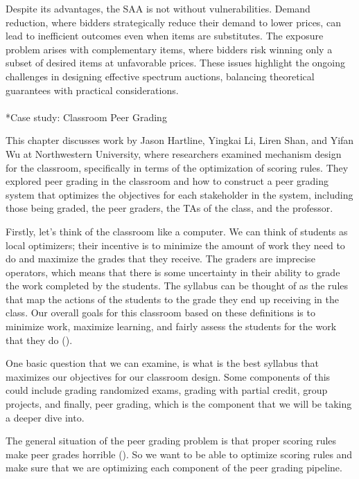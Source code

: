 \documentclass[
  letterpaper,
  numbers=noenddot,
  DIV=11]{scrreprt}
\makeatletter
\let\oldparagraph\paragraph
\renewcommand{\paragraph}{
    \@ifstar
      \xxxParagraphStar
      \xxxParagraphNoStar
  }
\newcommand{\xxxParagraphStar}[1]{\oldparagraph*{#1}\mbox{}}
\newcommand{\xxxParagraphNoStar}[1]{\oldparagraph{#1}\mbox{}}
\theoremstyle{definition}
\theoremstyle{plain}
\theoremstyle{plain}
\theoremstyle{remark}
\makeatother
\begin{document}
Despite its advantages, the SAA is not without vulnerabilities. Demand
reduction, where bidders strategically reduce their demand to lower
prices, can lead to inefficient outcomes even when items are
substitutes. The exposure problem arises with complementary items, where
bidders risk winning only a subset of desired items at unfavorable
prices. These issues highlight the ongoing challenges in designing
effective spectrum auctions, balancing theoretical guarantees with
practical considerations.

\paragraph*{Case study: Classroom Peer
Grading}\label{case-study-classroom-peer-grading}

This chapter discusses work by Jason Hartline, Yingkai Li, Liren Shan,
and Yifan Wu at Northwestern University, where researchers examined
mechanism design for the classroom, specifically in terms of the
optimization of scoring rules. They explored peer grading in the
classroom and how to construct a peer grading system that optimizes the
objectives for each stakeholder in the system, including those being
graded, the peer graders, the TAs of the class, and the professor.

Firstly, let's think of the classroom like a computer. We can think of
students as local optimizers; their incentive is to minimize the amount
of work they need to do and maximize the grades that they receive. The
graders are imprecise operators, which means that there is some
uncertainty in their ability to grade the work completed by the
students. The syllabus can be thought of as the rules that map the
actions of the students to the grade they end up receiving in the class.
Our overall goals for this classroom based on these definitions is to
minimize work, maximize learning, and fairly assess the students for the
work that they do ().

One basic question that we can examine, is what is the best syllabus
that maximizes our objectives for our classroom design. Some components
of this could include grading randomized exams, grading with partial
credit, group projects, and finally, peer grading, which is the
component that we will be taking a deeper dive into.

The general situation of the peer grading problem is that proper scoring
rules make peer grades horrible (). So we want to be able to optimize scoring rules and make
sure that we are optimizing each component of the peer grading pipeline.
\end{document}
